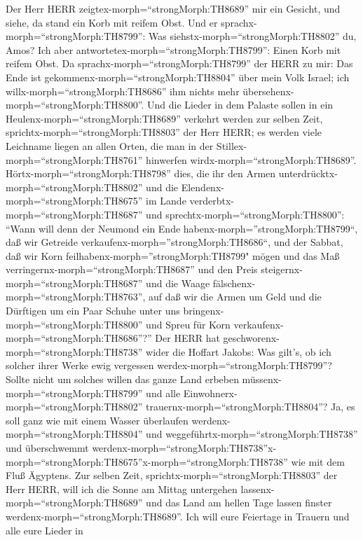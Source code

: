 Der Herr HERR zeigtex-morph=``strongMorph:TH8689'' mir ein
Gesicht, und siehe, da stand ein Korb mit reifem Obst.  Und
er sprachx-morph=``strongMorph:TH8799'': Was
siehstx-morph=``strongMorph:TH8802'' du, Amos? Ich aber
antwortetex-morph=``strongMorph:TH8799'': Einen Korb mit reifem Obst. Da
sprachx-morph=``strongMorph:TH8799'' der HERR zu mir: Das Ende ist
gekommenx-morph=``strongMorph:TH8804'' über mein Volk Israel; ich
willx-morph=``strongMorph:TH8686'' ihm nichts mehr
übersehenx-morph=``strongMorph:TH8800''.  Und die Lieder in
dem Palaste sollen in ein Heulenx-morph=``strongMorph:TH8689'' verkehrt
werden zur selben Zeit, sprichtx-morph=``strongMorph:TH8803'' der Herr
HERR; es werden viele Leichname liegen an allen Orten, die man in der
Stillex-morph=``strongMorph:TH8761'' hinwerfen
wirdx-morph=``strongMorph:TH8689''. 
Hörtx-morph=``strongMorph:TH8798'' dies, die ihr den Armen
unterdrücktx-morph=``strongMorph:TH8802'' und die
Elendenx-morph=``strongMorph:TH8675'' im Lande
verderbtx-morph=``strongMorph:TH8687''  und
sprechtx-morph=``strongMorph:TH8800'': ``Wann will denn der Neumond ein
Ende habenx-morph=''strongMorph:TH8799``, daß wir Getreide
verkaufenx-morph=''strongMorph:TH8686``, und der Sabbat, daß wir Korn
feilhabenx-morph=''strongMorph:TH8799" mögen und das Maß
verringernx-morph=``strongMorph:TH8687'' und den Preis
steigernx-morph=``strongMorph:TH8687'' und die Waage
fälschenx-morph=``strongMorph:TH8763'',  auf daß wir die
Armen um Geld und die Dürftigen um ein Paar Schuhe unter uns
bringenx-morph=``strongMorph:TH8800'' und Spreu für Korn
verkaufenx-morph=``strongMorph:TH8686''?''  Der HERR hat
geschworenx-morph=``strongMorph:TH8738'' wider die Hoffart Jakobs: Was
gilt's, ob ich solcher ihrer Werke ewig vergessen
werdex-morph=``strongMorph:TH8799''?  Sollte nicht um
solches willen das ganze Land erbeben
müssenx-morph=``strongMorph:TH8799'' und alle
Einwohnerx-morph=``strongMorph:TH8802''
trauernx-morph=``strongMorph:TH8804''? Ja, es soll ganz wie mit einem
Wasser überlaufen werdenx-morph=``strongMorph:TH8804'' und
weggeführtx-morph=``strongMorph:TH8738'' und überschwemmt
werdenx-morph=``strongMorph:TH8738''\textbar x-morph=``strongMorph:TH8675''x-morph=``strongMorph:TH8738''
wie mit dem Fluß Ägyptens.  Zur selben Zeit,
sprichtx-morph=``strongMorph:TH8803'' der Herr HERR, will ich die Sonne
am Mittag untergehen lassenx-morph=``strongMorph:TH8689'' und das Land
am hellen Tage lassen finster werdenx-morph=``strongMorph:TH8689''.
 Ich will eure Feiertage in Trauern und alle eure Lieder in
